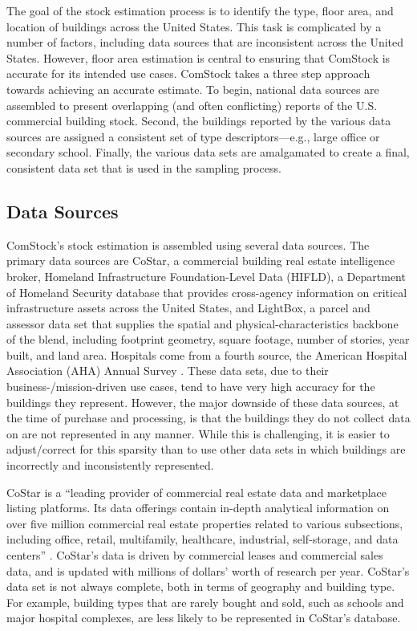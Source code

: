 The goal of the stock estimation process is to identify the type, floor area, and location of buildings across the United States. This task is complicated by a number of factors, including data sources that are inconsistent across the United States. However, floor area estimation is central to ensuring that ComStock is accurate for its intended use cases. ComStock takes a three step approach towards achieving an accurate estimate. To begin, national data sources are assembled to present overlapping (and often conflicting) reports of the U.S. commercial building stock. Second, the buildings reported by the various data sources are assigned a consistent set of type descriptors---e.g., large office or secondary school. Finally, the various data sets are amalgamated to create a final, consistent data set that is used in the sampling process.

\subsection{Data Sources}\label{sec:data_sources}

ComStock's stock estimation is assembled using several data sources. The primary data sources are CoStar, a commercial building real estate intelligence broker, Homeland Infrastructure Foundation-Level Data (HIFLD), a Department of Homeland Security database that provides cross-agency information on critical infrastructure assets across the United States, and LightBox, a parcel and assessor data set that supplies the spatial and physical-characteristics backbone of the blend, including footprint geometry, square footage, number of stories, year built, and land area. Hospitals come from a fourth source, the American Hospital Association (AHA) Annual Survey \citep{aha_annual_survey_2022}. These data sets, due to their business-/mission-driven use cases, tend to have very high accuracy for the buildings they represent. However, the major downside of these data sources, at the time of purchase and processing, is that the buildings they do not collect data on are not represented in any manner. While this is challenging, it is easier to adjust/correct for this sparsity than to use other data sets in which buildings are incorrectly and inconsistently represented.

CoStar is a ``leading provider of commercial real estate data and marketplace listing platforms. Its data offerings contain in-depth analytical information on over five million commercial real estate properties related to various subsections, including office, retail, multifamily, healthcare, industrial, self-storage, and data centers'' \citep{costar_10k}. CoStar's data is driven by commercial leases and commercial sales data, and is updated with millions of dollars' worth of research per year. CoStar's data set is not always complete, both in terms of geography and building type. For example, building types that are rarely bought and sold, such as schools and major hospital complexes, are less likely to be represented in CoStar's database.

